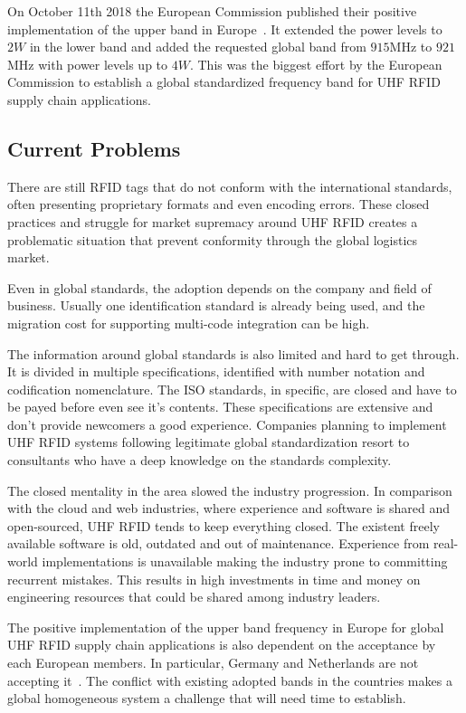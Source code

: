 On October 11th 2018 the European Commission published their positive implementation of the upper band in Europe~\cite{302208v030101pPdf}.
It extended the power levels to $2W$ in the lower band and added the requested global band from $915$MHz to $921$MHz with power levels up to $4W$. 
This was the biggest effort by the European Commission to establish a global standardized frequency band for \gls{UHF RFID} \gls{supply chain} applications.

\subsection{Current Problems}

There are still \gls{RFID} tags that do not conform with the international standards, often presenting proprietary formats and even encoding errors.
These closed practices and struggle for market supremacy around \gls{UHF RFID} creates a problematic situation that prevent conformity through the global logistics market.

Even in global standards, the adoption depends on the company and field of business. Usually one identification standard is already being used, and the migration cost for supporting multi-code integration can be high.

The information around global standards is also limited and hard to get through. It is divided in multiple specifications, identified with number notation and codification nomenclature. 
The ISO standards, in specific, are closed and have to be payed before even see it's contents.
These specifications are extensive and don't provide newcomers a good experience. 
Companies planning to implement \gls{UHF RFID} systems following legitimate global standardization resort to consultants who have a deep knowledge on the standards complexity.

The closed mentality in the area slowed the industry progression. In comparison with the cloud and web industries, where experience and software is shared and open-sourced, \gls{UHF RFID} tends to keep everything closed. The existent freely available software is old, outdated and out of maintenance. Experience from real-world implementations is unavailable making the industry prone to committing recurrent mistakes. This results in high investments in time and money on engineering resources that could be shared among industry leaders.

The positive implementation of the upper band frequency in Europe for global \gls{UHF RFID} \gls{supply chain} applications is also dependent on the acceptance by each European members. In particular, Germany and Netherlands are not accepting it~\cite{EUUpperBand}. The conflict with existing adopted bands in the countries makes a global homogeneous system a challenge that will need time to establish.

